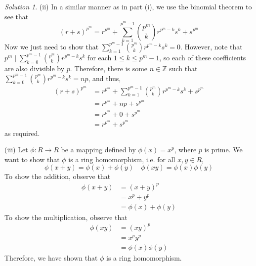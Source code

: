 \documentclass[11pt]{amsart}
\theoremstyle{definition}\newtheorem{question}{Question}
\theoremstyle{definition}\newtheorem{claim}{Claim}
\theoremstyle{remark}\newtheorem*{solution}{Solution}
\newcommand{\Z}{\mathbb{Z}}
\begin{document}
\begin{solution}
    (ii) In a similar manner as in part (i), we use the binomial theorem to see that
    \begin{equation*}
        (r + s)^{p^m} = r^{p^m} + \sum_{k = 1}^{p^m - 1} {p^m \choose k} r^{p^m - k}s^k + s^{p^m}
    \end{equation*}
    Now we just need to show that $\sum_{k = 1}^{p^m - 1} {p^m \choose k} r^{p^m - k}s^k = 0$. However, note that $p^m \mid \sum_{k = 0}^{p^m - 1} {p^m \choose k} r^{p^m - k}s^k$ for each $1 \leq k \leq p^m - 1$, so each of these coefficients are also divisible by $p$. Therefore, there is some $n \in \Z$ such that $\sum_{k = 0}^{p^m - 1} {p^m \choose k} r^{p^m - k}s^k = np$, and thus,
    \begin{align*}
        (r + s)^{p^m} &= r^{p^m} + \sum_{k = 1}^{p^m - 1} {p^m \choose k} r^{p^m - k}s^k + s^{p^m} \\
        &= r^{p^m} + np + s^{p^m} \\
        &= r^{p^m} + 0 + s^{p^m} \\
        &= r^{p^m} + s^{p^m}
    \end{align*}
    as required.

    (iii) Let $\phi : R \to R$ be a mapping defined by $\phi(x) = x^p$, where $p$ is prime. We want to show that $\phi$ is a ring homomorphism, i.e. for all $x, y \in R$,
    \begin{equation*}
        \phi(x + y) = \phi(x) + \phi(y) \quad \phi(xy) = \phi(x)\phi(y)
    \end{equation*}
    To show the addition, observe that
    \begin{align*}
        \phi(x + y) &= (x + y)^p \\
        &= x^p + y^p \tag{from (i)} \\
        &= \phi(x) + \phi(y)
    \end{align*}
    To show the multiplication, observe that
    \begin{align*}
        \phi(xy) &= (xy)^p \\
        &= x^p y^p \tag{because $R$ is commutative} \\
        &= \phi(x)\phi(y)
    \end{align*}
    Therefore, we have shown that $\phi$ is a ring homomorphism.
\end{solution}

\newpage
\end{document}

